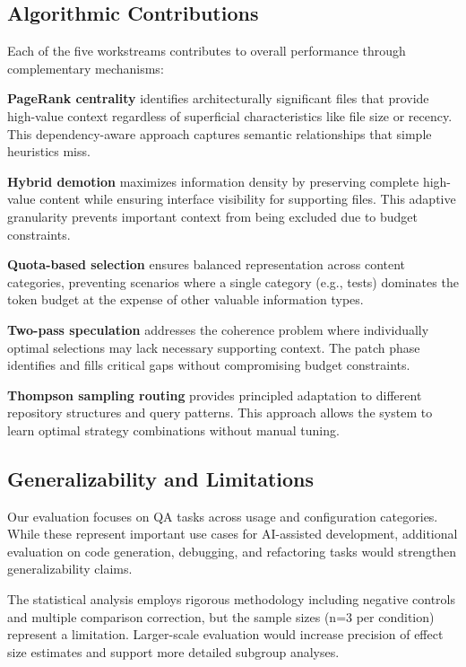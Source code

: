\documentclass[conference]{IEEEtran}
\begin{document}
\subsection{Algorithmic Contributions}

Each of the five workstreams contributes to overall performance through complementary mechanisms:

\textbf{PageRank centrality} identifies architecturally significant files that provide high-value context regardless of superficial characteristics like file size or recency. This dependency-aware approach captures semantic relationships that simple heuristics miss.

\textbf{Hybrid demotion} maximizes information density by preserving complete high-value content while ensuring interface visibility for supporting files. This adaptive granularity prevents important context from being excluded due to budget constraints.

\textbf{Quota-based selection} ensures balanced representation across content categories, preventing scenarios where a single category (e.g., tests) dominates the token budget at the expense of other valuable information types.

\textbf{Two-pass speculation} addresses the coherence problem where individually optimal selections may lack necessary supporting context. The patch phase identifies and fills critical gaps without compromising budget constraints.

\textbf{Thompson sampling routing} provides principled adaptation to different repository structures and query patterns. This approach allows the system to learn optimal strategy combinations without manual tuning.

\subsection{Generalizability and Limitations}

Our evaluation focuses on QA tasks across usage and configuration categories. While these represent important use cases for AI-assisted development, additional evaluation on code generation, debugging, and refactoring tasks would strengthen generalizability claims.

The statistical analysis employs rigorous methodology including negative controls and multiple comparison correction, but the sample sizes (n=3 per condition) represent a limitation. Larger-scale evaluation would increase precision of effect size estimates and support more detailed subgroup analyses.
\end{document}
